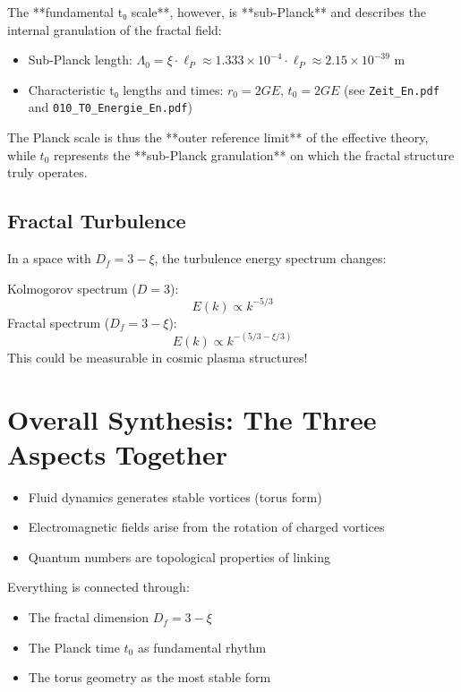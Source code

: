 The **fundamental t₀ scale**, however, is **sub-Planck** and describes the internal granulation of the fractal field:
\begin{itemize}
	\item Sub-Planck length: \( \Lambda_0 = \xi \cdot \ell_P \approx 1.333 \times 10^{-4} \cdot \ell_P \approx 2.15 \times 10^{-39} \) m
	\item Characteristic t₀ lengths and times: \( r_0 = 2GE \), \( t_0 = 2GE \) (see \texttt{Zeit\_En.pdf} and \texttt{010\_T0\_Energie\_En.pdf})
\end{itemize}

The Planck scale is thus the **outer reference limit** of the effective theory, while \( t_0 \) represents the **sub-Planck granulation** on which the fractal structure truly operates.

\subsection{Fractal Turbulence}
In a space with \( D_f = 3 - \xi \), the turbulence energy spectrum changes:

Kolmogorov spectrum (\( D = 3 \)):
\[
E(k) \propto k^{-5/3}
\]
Fractal spectrum (\( D_f = 3 - \xi \)):
\[
E(k) \propto k^{-(5/3 - \xi/3)}
\]
This could be measurable in cosmic plasma structures!

\section{Overall Synthesis: The Three Aspects Together}
\begin{itemize}
	\item Fluid dynamics generates stable vortices (torus form)
	\item Electromagnetic fields arise from the rotation of charged vortices
	\item Quantum numbers are topological properties of linking
\end{itemize}

Everything is connected through:
\begin{itemize}
	\item The fractal dimension \( D_f = 3 - \xi \)
	\item The Planck time \( t_0 \) as fundamental rhythm
	\item The torus geometry as the most stable form
\end{itemize}
